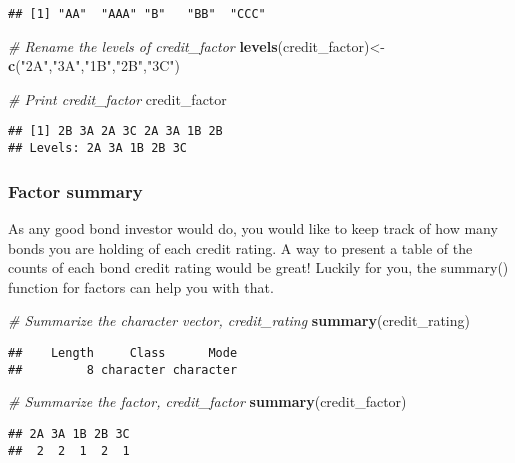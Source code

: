 \documentclass[]{article}
\newenvironment{Shaded}{\begin{snugshade}}{\end{snugshade}}
\newcommand{\KeywordTok}[1]{\textcolor[rgb]{0.13,0.29,0.53}{\textbf{#1}}}
\newcommand{\StringTok}[1]{\textcolor[rgb]{0.31,0.60,0.02}{#1}}
\newcommand{\CommentTok}[1]{\textcolor[rgb]{0.56,0.35,0.01}{\textit{#1}}}
\newcommand{\NormalTok}[1]{#1}
\begin{document}
\begin{verbatim}
## [1] "AA"  "AAA" "B"   "BB"  "CCC"
\end{verbatim}

\begin{Shaded}
\begin{Highlighting}[]
\CommentTok{# Rename the levels of credit_factor}
\KeywordTok{levels}\NormalTok{(credit_factor)<-}\KeywordTok{c}\NormalTok{(}\StringTok{"2A"}\NormalTok{,}\StringTok{"3A"}\NormalTok{,}\StringTok{"1B"}\NormalTok{,}\StringTok{"2B"}\NormalTok{,}\StringTok{"3C"}\NormalTok{)}

\CommentTok{# Print credit_factor}
\NormalTok{credit_factor}
\end{Highlighting}
\end{Shaded}

\begin{verbatim}
## [1] 2B 3A 2A 3C 2A 3A 1B 2B
## Levels: 2A 3A 1B 2B 3C
\end{verbatim}

\subsubsection{Factor summary}\label{factor-summary}

As any good bond investor would do, you would like to keep track of how
many bonds you are holding of each credit rating. A way to present a
table of the counts of each bond credit rating would be great! Luckily
for you, the summary() function for factors can help you with that.

\begin{Shaded}
\begin{Highlighting}[]
\CommentTok{# Summarize the character vector, credit_rating}
\KeywordTok{summary}\NormalTok{(credit_rating)}
\end{Highlighting}
\end{Shaded}

\begin{verbatim}
##    Length     Class      Mode 
##         8 character character
\end{verbatim}

\begin{Shaded}
\begin{Highlighting}[]
\CommentTok{# Summarize the factor, credit_factor}
\KeywordTok{summary}\NormalTok{(credit_factor)}
\end{Highlighting}
\end{Shaded}

\begin{verbatim}
## 2A 3A 1B 2B 3C 
##  2  2  1  2  1
\end{verbatim}
\end{document}
